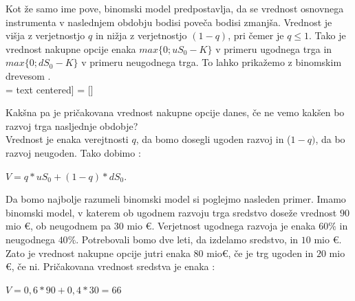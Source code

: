 Kot že samo ime pove, binomski model predpostavlja, da se vrednost osnovnega instrumenta v naslednjem obdobju bodisi poveča bodisi zmanjša. Vrednost je višja z verjetnostjo $q$ in nižja z verjetnostjo $(1-q)$, pri čemer je $q \leq 1$. Tako je vrednost nakupne opcije enaka $max\{0; uS_0 - K\}$ v primeru ugodnega trga in $max\{0; dS_0 - K\}$ v primeru neugodnega trga. To lahko prikažemo z binomskim drevesom \cite[str. 52, 53]{Brach}.\\

 =  text centered]
 = []

Kakšna pa je pričakovana vrednost nakupne opcije danes, če ne vemo kakšen bo razvoj trga nasljednje obdobje? \\
Vrednost je enaka verejtnosti $q$, da bomo dosegli ugoden razvoj in ($1-q)$, da bo razvoj neugoden. Tako dobimo \cite[str. 52]{Brach}:
\begin{center}
$V = q * uS_0 + (1-q) * dS_0$.
\end{center}

Da bomo najbolje razumeli binomski model si poglejmo nasleden primer. Imamo binomski model, v katerem ob ugodnem razvoju trga sredstvo doseže vrednost $90$ mio €, ob neugodnem pa $30$ mio €. Verjetnost ugodnega razvoja je enaka $60 \%$ in neugodnega $40 \%$. Potrebovali bomo dve leti, da izdelamo sredstvo, in $10$ mio €. Zato je vrednost nakupne opcije jutri enaka $80$ mio€, če je trg ugoden in $20$ mio €, če ni. Pričakovana vrednost sredstva je enaka \cite[str. 52, 53]{Brach}: 
\begin{center}
$V = 0,6 * 90 + 0,4 * 30 = 66$
\end{center}

